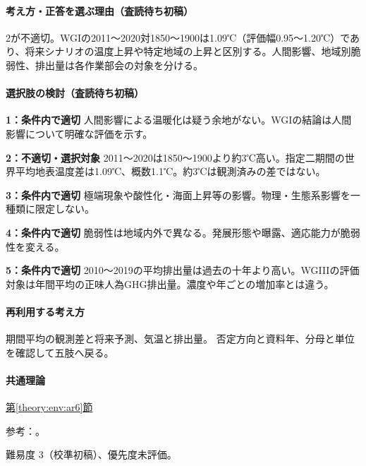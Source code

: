 \paragraph{考え方・正答を選ぶ理由（査読待ち初稿）} 2が不適切。WGIの2011〜2020対1850〜1900は1.09℃（評価幅0.95〜1.20℃）であり、将来シナリオの温度上昇や特定地域の上昇と区別する。人間影響、地域別脆弱性、排出量は各作業部会の対象を分ける。

\paragraph{選択肢の検討（査読待ち初稿）}\mbox{}\par

\noindent\textbf{1：条件内で適切} 人間影響による温暖化は疑う余地がない。WGIの結論は人間影響について明確な評価を示す。\par

\noindent\textbf{2：不適切・選択対象} 2011〜2020は1850〜1900より約3℃高い。指定二期間の世界平均地表温度差は1.09℃、概数1.1℃。約3℃は観測済みの差ではない。\par

\noindent\textbf{3：条件内で適切} 極端現象や酸性化・海面上昇等の影響。物理・生態系影響を一種類に限定しない。\par

\noindent\textbf{4：条件内で適切} 脆弱性は地域内外で異なる。発展形態や曝露、適応能力が脆弱性を変える。\par

\noindent\textbf{5：条件内で適切} 2010〜2019の平均排出量は過去の十年より高い。WGIIIの評価対象は年間平均の正味人為GHG排出量。濃度や年ごとの増加率とは違う。\par

\paragraph{再利用する考え方} 期間平均の観測差と将来予測、気温と排出量。 否定方向と資料年、分母と単位を確認して五肢へ戻る。

\paragraph{共通理論} \hyperref[theory:env:ar6]{第\ref*{theory:env:ar6}節}

\par 参考：\cite{env60_ar6}。

\par 難易度 3（校準初稿）、優先度未評価。

